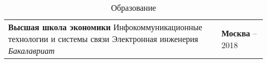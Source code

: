 \documentclass{article}
\begin{document}
\begin{table}[h!]
\begin{center}
\caption*{Образование}
\def\arraystretch{1.7}%
\begin{tabular}
{ L{13cm} R{5cm} } \hhline{|=|=|}

\textbf{Высшая школа экономики}\newline
Инфокоммуникационные технологии и системы связи\newline
Электронная инженерия\newline
\emph{Бакалавриат}\newline
& \textbf{Москва} – 2018\\

\end{tabular}
\end{center}
\end{table}
\end{document}
